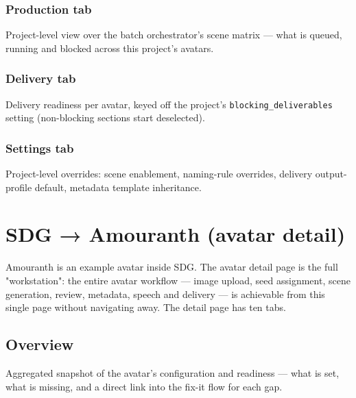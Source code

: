 \subsubsection{Production tab}
Project-level view over the batch orchestrator's scene matrix — what is queued,
running and blocked across this project's avatars.

\subsubsection{Delivery tab}
Delivery readiness per avatar, keyed off the project's \texttt{blocking\_deliverables}
setting (non-blocking sections start deselected).

\subsubsection{Settings tab}
Project-level overrides: scene enablement, naming-rule overrides, delivery
output-profile default, metadata template inheritance.

\section{SDG → Amouranth (avatar detail)}
\label{sec:ws-amouranth}

Amouranth is an example avatar inside SDG. The avatar detail page is the full
"workstation": the entire avatar workflow — image upload, seed assignment,
scene generation, review, metadata, speech and delivery — is achievable from
this single page without navigating away. The detail page has ten tabs.



\subsection{Overview}
Aggregated snapshot of the avatar's configuration and readiness — what is set,
what is missing, and a direct link into the fix-it flow for each gap.

